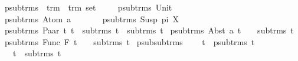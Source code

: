 \begin{isabellebody}
\isanewline
{}\isamarkupfalse%
\ psub{\isacharunderscore}{\kern0pt}trms\ {\isacharcolon}{\kern0pt}{\isacharcolon}{\kern0pt}\ {\isachardoublequoteopen}trm\ {\isasymRightarrow}\ trm\ set{\isachardoublequoteclose}\isanewline
\ \ \isanewline
\ \ {\isachardoublequoteopen}psub{\isacharunderscore}{\kern0pt}trms\ {\isacharparenleft}{\kern0pt}Unit{\isacharparenright}{\kern0pt}\ \ \ \ \ \ \ {\isacharequal}{\kern0pt}\ {\isacharbraceleft}{\kern0pt}{\isacharbraceright}{\kern0pt}{\isachardoublequoteclose}\isanewline
{\isacharbar}{\kern0pt}\ {\isachardoublequoteopen}psub{\isacharunderscore}{\kern0pt}trms\ {\isacharparenleft}{\kern0pt}Atom\ a{\isacharparenright}{\kern0pt}\ \ \ \ \ {\isacharequal}{\kern0pt}\ {\isacharbraceleft}{\kern0pt}{\isacharbraceright}{\kern0pt}{\isachardoublequoteclose}\isanewline
{\isacharbar}{\kern0pt}\ {\isachardoublequoteopen}psub{\isacharunderscore}{\kern0pt}trms\ {\isacharparenleft}{\kern0pt}Susp\ pi\ X{\isacharparenright}{\kern0pt}\ \ {\isacharequal}{\kern0pt}\ {\isacharbraceleft}{\kern0pt}{\isacharbraceright}{\kern0pt}{\isachardoublequoteclose}\isanewline
{\isacharbar}{\kern0pt}\ {\isachardoublequoteopen}psub{\isacharunderscore}{\kern0pt}trms\ {\isacharparenleft}{\kern0pt}Paar\ t{}\ t{}{\isacharparenright}{\kern0pt}\ {\isacharequal}{\kern0pt}\ sub{\isacharunderscore}{\kern0pt}trms\ t{}\ {\isasymunion}\ sub{\isacharunderscore}{\kern0pt}trms\ t{}{\isachardoublequoteclose}\isanewline
{\isacharbar}{\kern0pt}\ {\isachardoublequoteopen}psub{\isacharunderscore}{\kern0pt}trms\ {\isacharparenleft}{\kern0pt}Abst\ a\ t{\isacharparenright}{\kern0pt}\ \ \ {\isacharequal}{\kern0pt}\ sub{\isacharunderscore}{\kern0pt}trms\ t{\isachardoublequoteclose}\isanewline
{\isacharbar}{\kern0pt}\ {\isachardoublequoteopen}psub{\isacharunderscore}{\kern0pt}trms\ {\isacharparenleft}{\kern0pt}Func\ F\ t{\isacharparenright}{\kern0pt}\ \ \ {\isacharequal}{\kern0pt}\ sub{\isacharunderscore}{\kern0pt}trms\ t{\isachardoublequoteclose}\isanewline
\isanewline
{}\isamarkupfalse%
\ psub{\isacharunderscore}{\kern0pt}sub{\isacharunderscore}{\kern0pt}trms{\isacharcolon}{\kern0pt}\ \isanewline
\ \ \ {\isachardoublequoteopen}t{}\ {\isasymin}\ psub{\isacharunderscore}{\kern0pt}trms\ t{}{\isachardoublequoteclose}\ \isanewline
\ \ \ {\isachardoublequoteopen}t{}\ {\isasymin}\ sub{\isacharunderscore}{\kern0pt}trms\ t{}{\isachardoublequoteclose}\isanewline
%
\isadelimproof
\ \ %
\endisadelimproof
%
\isatagproof

\end{isabellebody}
